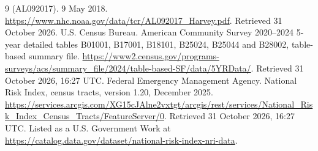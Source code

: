 \documentclass[10pt,twocolumn,a4paper]{article}
\begin{document}
\begin{thebibliography}{9}
(AL092017). 9 May 2018. \url{https://www.nhc.noaa.gov/data/tcr/AL092017_Harvey.pdf}. Retrieved 31 October 2026.
 U.S. Census Bureau. American Community Survey 2020--2024 5-year detailed tables B01001, B17001, B18101,
B25024, B25044 and B28002, table-based summary file.
\url{https://www2.census.gov/programs-surveys/acs/summary_file/2024/table-based-SF/data/5YRData/}. Retrieved 31 October
2026, 16:27 UTC.
 Federal Emergency Management Agency. National Risk Index, census tracts, version 1.20, December 2025.
\url{https://services.arcgis.com/XG15cJAlne2vxtgt/arcgis/rest/services/National_Risk_Index_Census_Tracts/FeatureServer/0}.
Retrieved 31 October 2026, 16:27 UTC. Listed as a U.S. Government Work at
\url{https://catalog.data.gov/dataset/national-risk-index-nri-data}.
\end{thebibliography}

\newpage
\appendix
\end{document}

